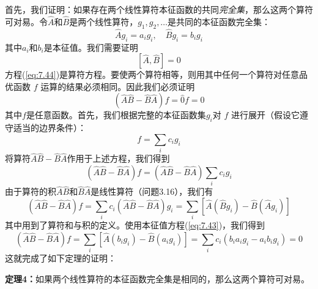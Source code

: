     首先，我们证明：如果存在两个线性算符本征函数的共同\textit{完全集}，那么这两个算符可对易。令$\hat{A}$和$\hat{B}$是两个线性算符，$g_1,g_2,\ldots$是共同的本征函数完全集：
    \begin{equation}
        \hat{A}g_i = a_ig_i, \quad \hat{B}g_i = b_ig_i
        \label{eq:7.43}
    \end{equation}
    其中$a_i$和$b_i$是本征值。我们需要证明
    \begin{equation}
        \left[\hat{A},\hat{B}\right] = 0
        \label{eq:7.44}
    \end{equation}
    方程(\ref{eq:7.44})是算符方程。要使两个算符相等，则用其中任何一个算符对任意品优函数 $f$ 运算的结果必须相同。因此我们必须证明
    \begin{equation*}
        \left(\hat{A}\hat{B} - \hat{B}\hat{A}\right)f = \hat{0}f = 0
    \end{equation*}
    其中$f$是任意函数。首先，我们根据完整的本征函数集$g_i$对 $f$ 进行展开（假设它遵守适当的边界条件）：
    \begin{equation*}
        f = \sum_{i}c_i g_i
    \end{equation*}
    将算符$\hat{A}\hat{B}-\hat{B}\hat{A}$作用于上述方程，我们得到
    \begin{equation*}
        \left(\hat{A}\hat{B} - \hat{B}\hat{A}\right)f = \left(\hat{A}\hat{B} - \hat{B}\hat{A}\right)\sum_{i}c_ig_i
    \end{equation*}
    由于算符的积$\hat{A}\hat{B}$和$\hat{B}\hat{A}$是线性算符（问题3.16），我们有
    \begin{equation*}
        \left(\hat{A}\hat{B}-\hat{B}\hat{A}\right)f = \sum_{i}c_i\left(\hat{A}\hat{B}-\hat{B}\hat{A}\right)g_i = \sum_{i}\left[\hat{A}\left(\hat{B}g_i\right) - \hat{B}\left(\hat{A}g_i\right)\right]
    \end{equation*}
    其中用到了算符和与积的定义。使用本征值方程(\ref{eq:7.43})，我们得到
    \begin{equation*}
        \left(\hat{A}\hat{B}-\hat{B}\hat{A}\right)f = \sum_{i}\left[\hat{A}\left(b_ig_i\right)- \hat{B}\left(a_ig_i\right)\right] = \sum_{i}c_i\left(b_ia_ig_i - a_ib_ig_i\right) = 0
    \end{equation*}
    这就完成了如下定理的证明：
    \begin{center}
        \parbox{0.8\textwidth}{
            \textbf{定理4：}如果两个线性算符的本征函数完全集是相同的，那么这两个算符可对易。
        }
    \end{center}

